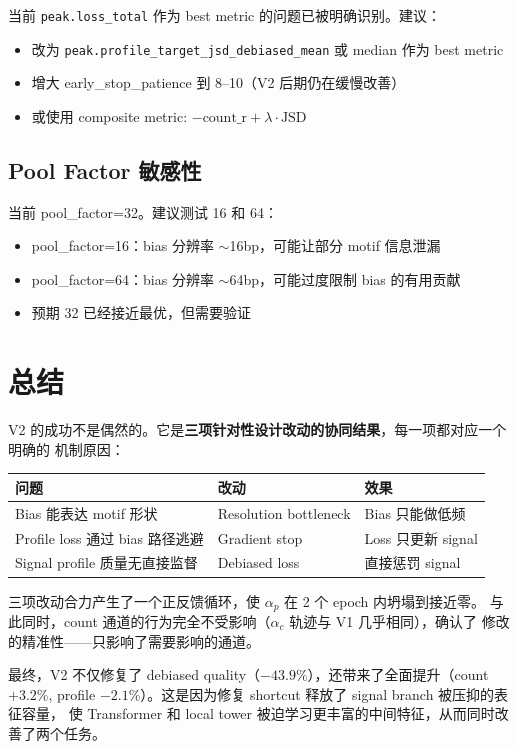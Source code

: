 \documentclass[11pt,a4paper]{ctexart}
\begin{document}
当前 \texttt{peak.loss\_total} 作为 best metric 的问题已被明确识别。建议：
\begin{itemize}[leftmargin=2em]
  \item 改为 \texttt{peak.profile\_target\_jsd\_debiased\_mean} 或 median 作为 best metric
  \item 增大 early\_stop\_patience 到 8--10（V2 后期仍在缓慢改善）
  \item 或使用 composite metric: $-\text{count\_r} + \lambda \cdot \text{JSD}$
\end{itemize}

\subsection{Pool Factor 敏感性}

当前 pool\_factor=32。建议测试 16 和 64：
\begin{itemize}[leftmargin=2em]
  \item pool\_factor=16：bias 分辨率 $\sim$16bp，可能让部分 motif 信息泄漏
  \item pool\_factor=64：bias 分辨率 $\sim$64bp，可能过度限制 bias 的有用贡献
  \item 预期 32 已经接近最优，但需要验证
\end{itemize}

\section{总结}

V2 的成功不是偶然的。它是\textbf{三项针对性设计改动的协同结果}，每一项都对应一个明确的
机制原因：

\begin{center}
\begin{tabular}{lll}
\toprule
问题 & 改动 & 效果 \\
\midrule
Bias 能表达 motif 形状 & Resolution bottleneck & Bias 只能做低频 \\
Profile loss 通过 bias 路径逃避 & Gradient stop & Loss 只更新 signal \\
Signal profile 质量无直接监督 & Debiased loss & 直接惩罚 signal \\
\bottomrule
\end{tabular}
\end{center}

三项改动合力产生了一个正反馈循环，使 $\alpha_p$ 在 2 个 epoch 内坍塌到接近零。
与此同时，count 通道的行为完全不受影响（$\alpha_c$ 轨迹与 V1 几乎相同），确认了
修改的精准性——只影响了需要影响的通道。

最终，V2 不仅修复了 debiased quality（$-43.9\%$），还带来了全面提升（count $+3.2\%$,
profile $-2.1\%$）。这是因为修复 shortcut 释放了 signal branch 被压抑的表征容量，
使 Transformer 和 local tower 被迫学习更丰富的中间特征，从而同时改善了两个任务。
\end{document}
